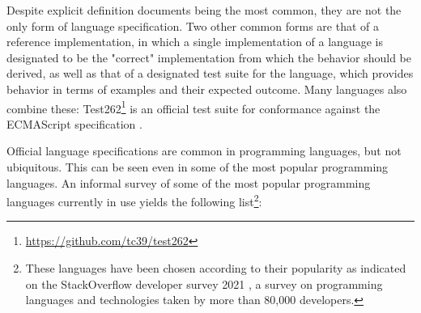 Despite explicit definition documents being the most common, they are not the only form of language specification. Two other common forms are that of a reference implementation, in which a single implementation of a language is designated to be the "correct" implementation from which the behavior should be derived, as well as that of a designated test suite for the language, which provides behavior in terms of examples and their expected outcome. Many languages also combine these: Test262\footnote{\url{https://github.com/tc39/test262}} is an official test suite for conformance against the ECMAScript specification \cite{ecma1999262}.\\


Official language specifications are common in programming languages, but not ubiquitous. This can be seen even in some of the most popular programming languages. An informal survey of some of the most popular programming languages currently in use yields the following list\footnote{These languages have been chosen according to their popularity as indicated on the StackOverflow developer survey 2021 \cite{stack_overflow_survey_2021}, a survey on programming languages and technologies taken by more than 80,000 developers.}:

